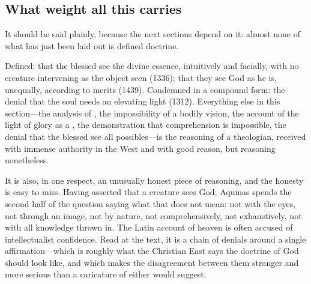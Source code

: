 \subsection{What weight all this carries}

It should be said plainly, because the next sections depend on it: almost none of what has just been laid out is defined doctrine.

Defined: that the blessed see the divine essence, intuitively and facially, with no creature intervening as the object seen (1336); that they see God as he is, unequally, according to merits (1439). Condemned in a compound form: the denial that the soul needs an elevating light (1312). Everything else in this section---the analysis of , the impossibility of a bodily vision, the account of the light of glory as a , the demonstration that comprehension is impossible, the denial that the blessed see all possibles---is the reasoning of a theologian, received with immense authority in the West and with good reason, but reasoning nonetheless.

It is also, in one respect, an unusually honest piece of reasoning, and the honesty is easy to miss. Having asserted that a creature sees God, Aquinas spends the second half of the question saying what that does not mean: not with the eyes, not through an image, not by nature, not comprehensively, not exhaustively, not with all knowledge thrown in. The Latin account of heaven is often accused of intellectualist confidence. Read at the text, it is a chain of denials around a single affirmation---which is roughly what the Christian East says the doctrine of God should look like, and which makes the disagreement between them stranger and more serious than a caricature of either would suggest.

